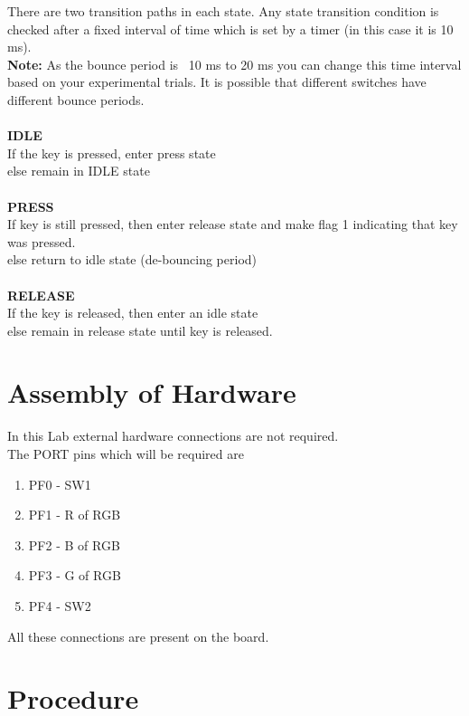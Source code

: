 \documentclass[a4paper,12pt,oneside]{book}
\begin{document}
There are two transition paths in each state. Any state transition condition is checked after a fixed interval
of time which is set by a timer (in this case it is 10 ms).
\\
\textbf{Note:} As the bounce period is ~10 ms to 20 ms you can change this time interval based on your experimental
trials. It is possible that different switches have different bounce periods.
\\
\\
\textbf{IDLE} \\
If the key is pressed, enter press state\\
else remain in IDLE state
\\
\\
\textbf{PRESS} \\
If key is still pressed, then enter release state and make flag 1 indicating that key was pressed.\\
else return to idle state (de-bouncing period)
\\
\\
\textbf{RELEASE} \\
If the key is released, then enter an idle state\\
else remain in release state until key is released.


\newpage
\section{Assembly of Hardware}
In this Lab external hardware connections are not required.\\
The PORT pins which will be required are 
\begin{enumerate}
\item PF0 - SW1
\item PF1 - R of RGB
\item PF2 - B of RGB
\item PF3 - G of RGB
\item PF4 - SW2
\end{enumerate}
All these connections are present on the board.


\section {Procedure}
\end{document}
